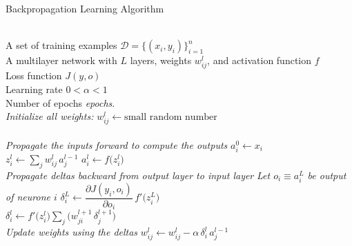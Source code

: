 \begin{breakablealgorithm}
\caption{Backpropagation Learning Algorithm}
\begin{algorithmic}
\Require \\
A set of training examples $\mathcal{D} = \{(x_i, y_i)\}_{i=1}^n$\\
A multilayer network with $L$ layers, weights $w_{ij}^l$, and activation function $f$\\
Loss function $J(y, o)$\\
Learning rate $0 < \alpha < 1$\\
Number of epochs \textit{epochs}.\\
    
\State \textit{Initialize all weights:} 
\State $w_{ij}^l \gets \text{small random number}$
\EndFor\\

\\
\State \textit{Propagate the inputs forward to compute the outputs}
\State $a_i^0 \gets x_i$
\EndFor \\
\State $z_i^l \gets \displaystyle\sum_j w_{ij}^l\,a_j^{l-1}$
\State $a_i^l \gets f\bigl(z_i^l\bigr)$
\EndFor
\EndFor\\

\State \textit{Propagate deltas backward from output layer to input layer}
\State \textit{Let  $o_i \equiv a_i^L$ be output of neurone $i$}
\State $\delta_i^L \gets \dfrac{\partial J(y_i,o_i)}{\partial o_i}\,f'\bigl(z_i^L\bigr)$
\EndFor\\
\State $\delta_i^l \gets f'\bigl(z_i^l\bigr) \sum_j\bigl(w_{ji}^{l+1}\,\delta_j^{l+1}\bigr)$
\EndFor
\EndFor\\

\State \textit{Update weights using the deltas}
\State $w_{ij}^l \gets w_{ij}^l - \alpha\,\delta_i^l\,a_j^{l-1}$
      \EndFor
    \EndFor
  \EndFor
\end{algorithmic}
\end{breakablealgorithm}
\hfill \break


